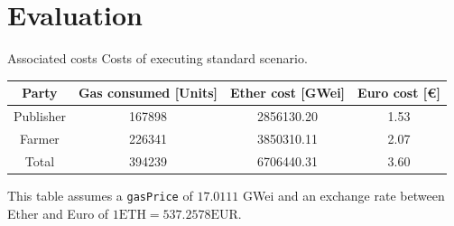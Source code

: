 \documentclass{beamer}
\newcommand{\code}[1]{\texttt{#1}}
\newcommand{\gaspricegwei}[0]{$17.0111$ GWei }
\newcommand{\ethtoeur}[0]{$1 \text{ETH} = 537.2578 \text{EUR}$}
\begin{document}
    \section{Evaluation}
    \begin{frame}{Associated costs}
        Costs of executing standard scenario.
        \begin{table}[h!]
            \begin{adjustbox}{max width=\textwidth}
                \centering
                \begin{tabular}{c c c c}
                    \toprule
                    Party & Gas consumed [Units] & Ether cost [GWei] & Euro cost [€]\\ 
                    \midrule
                    Publisher & 167898 & 2856130.20 & 1.53 \\ Farmer & 226341 & 3850310.11 & 2.07 \\ Total & 394239 & 6706440.31 & 3.60 \\
                    \bottomrule
                \end{tabular}
            \end{adjustbox}
        \end{table}
        This table assumes a \code{gasPrice} of \gaspricegwei and an exchange rate between Ether and Euro of \ethtoeur.
    \end{frame}
\end{document}
